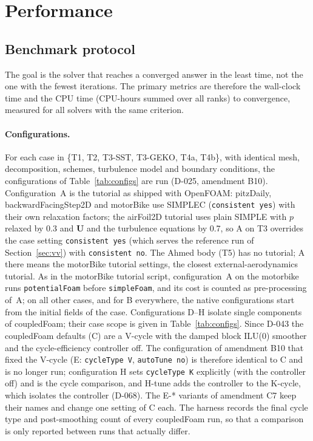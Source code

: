 \documentclass[11pt,a4paper]{article}
\newcommand{\vect}[1]{\mathbf{#1}}
\newcommand{\Uv}{\vect{U}}
\newcommand{\code}[1]{\texttt{#1}}
\begin{document}
\section{Performance}\label{sec:perf}

\subsection{Benchmark protocol}

The goal is the solver that reaches a converged answer in the least time,
not the one with the fewest iterations. The primary metrics are therefore the
wall-clock time and the CPU time (CPU-hours summed over all ranks) to
convergence, measured for all solvers with the same criterion.

\paragraph{Configurations.} For each case in \{T1, T2, T3-SST, T3-GEKO, T4a,
T4b\}, with identical mesh, decomposition, schemes, turbulence model and
boundary conditions, the configurations of Table~\ref{tab:configs} are run
(D-025, amendment B10). Configuration~A is the tutorial as shipped with
OpenFOAM: pitzDaily, backwardFacingStep2D and motorBike use SIMPLEC
(\code{consistent yes}) with their own relaxation factors; the airFoil2D
tutorial uses plain SIMPLE with $p$ relaxed by 0.3 and $\Uv$ and the
turbulence equations by 0.7, so A on T3 overrides the case setting
\code{consistent yes} (which serves the reference run of
Section~\ref{sec:vv}) with \code{consistent no}. The Ahmed body (T5) has no
tutorial; A there means the motorBike tutorial settings, the closest
external-aerodynamics tutorial. As in the motorBike tutorial script,
configuration~A on the motorbike runs \code{potentialFoam} before
\code{simpleFoam}, and its cost is counted as pre-processing of~A; on all
other cases, and for B everywhere, the native configurations start from the
initial fields of the case. Configurations D--H isolate single components of
coupledFoam; their case scope is given in Table~\ref{tab:configs}.
Since D-043 the coupledFoam defaults (C) are a V-cycle with the damped block
ILU(0) smoother and the cycle-efficiency controller off. The configuration
of amendment B10 that fixed the V-cycle (E: \code{cycleType V},
\code{autoTune no}) is therefore identical to C and is no longer run;
configuration H sets \code{cycleType K} explicitly (with the controller
off) and is the cycle comparison, and H-tune adds the controller to the
K-cycle, which isolates the controller (D-068). The E-* variants of
amendment C7 keep their names and change one setting of C each. The
harness records the final cycle type and post-smoothing count of every
coupledFoam run, so that a comparison is only reported between runs that
actually differ.
\end{document}
